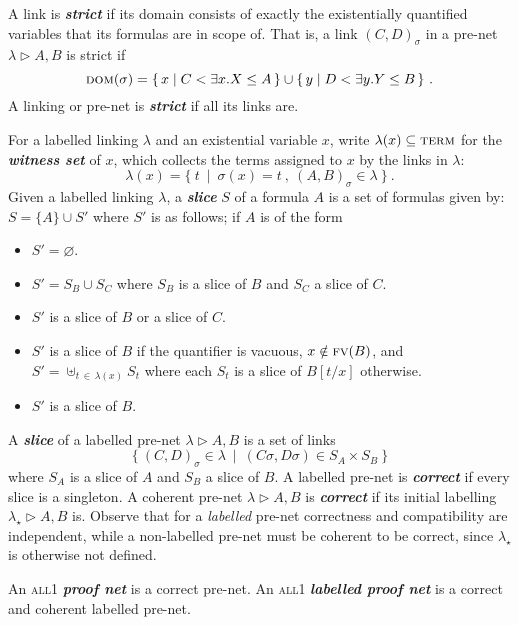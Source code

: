 \documentclass[UKenglish]{lipics-v2016}
\theoremstyle{plain}
\newcommand\defn[1]{\textit{\textbf{#1}}}
\newcommand\terms{\textsc{term}}
\newcommand\all{\textsc{all}}
\newcommand\dom[1]{\textsc{dom}(#1)}
\newcommand\+{+}
\renewcommand\*{\times}
\newcommand\fv{\textsc{fv}}
\newcommand\net[3]{#1\triangleright #2,#3}
\newcommand\link[3][\sigma]{(#2,#3)_{#1}}
\begin{document}



A link is \defn{strict} if its domain consists of exactly the existentially quantified variables that its formulas are in scope of. That is, a link $\link CD$ in a pre-net $\net\lambda AB$ is strict if
\[
	\dom\sigma = \{\,x \mid C < \exists x.X \leq A\,\}
			\cup \{\,y \mid D < \exists y.Y \leq B\,\}~.
\]
A linking or pre-net is \defn{strict} if all its links are.



For a labelled linking $\lambda$ and an existential variable $x$, write $\lambda(x)\subseteq\terms$ for the \defn{witness set} of $x$, which collects the terms assigned to $x$ by the links in $\lambda$:
\[
	\lambda(x) = \{~t~\mid~\sigma(x) = t~,~\link AB\in\lambda~\}~.
\]
%
Given a labelled linking $\lambda$, a \defn{slice} $S$ of a formula $A$ is a set of formulas given by: $S=\{A\}\cup S'$ where $S'$ is as follows; if $A$ is of the form
%
\begin{itemize}
	\item
{}				$S'=\varnothing$.
	\item
\makebox[40pt][l]{$B\+C$:} 			$S'=S_B\cup S_C$ where $S_B$ is a slice of $B$ and $S_C$ a slice of $C$.
	\item
\makebox[40pt][l]{$B\*C$:}			$S'$ is a slice of $B$ or a slice of $C$.
	\item
{}	$S'$ is a slice of $B$ if the quantifier is vacuous, $x\notin\fv(B)$, and
	\\[\itemsep]
	\hspace*{40pt}					$S'=\uplus_{t\,\in\,\lambda(x)}S_t$ where each $S_t$ is a slice of $B[t/x]$ otherwise.
	\item
{}	$S'$ is a slice of $B$.
\end{itemize}
%
A \defn{slice} of a labelled pre-net $\net\lambda AB$ is a set of links
\[
	\{~\link CD\in \lambda~\mid~(C\sigma,D\sigma)\in S_A\times S_B~\}
\]
where $S_A$ is a slice of $A$ and $S_B$ a slice of $B$. A labelled pre-net is \defn{correct} if every slice is a singleton. A coherent pre-net $\net\lambda AB$ is \defn{correct} if its initial labelling $\net{\lambda_\star}AB$ is. Observe that for a \emph{labelled} pre-net correctness and compatibility are independent, while a non-labelled pre-net must be coherent to be correct, since $\lambda_\star$ is otherwise not defined.

\begin{definition}
An \all1 \defn{proof net} is a correct pre-net. An \all1 \defn{labelled proof net} is a correct and coherent labelled pre-net.
\end{definition}
\end{document}
